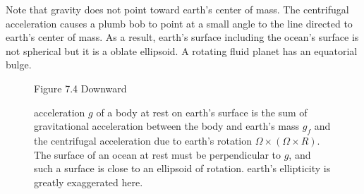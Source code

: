 Note that gravity does not point toward earth's center of mass. The centrifugal
acceleration causes a plumb bob to point at a small angle to the line directed
to earth's center of mass. As a result, earth's surface including the ocean's
surface is not spherical but it is a oblate ellipsoid. A rotating fluid planet
has an equatorial bulge.
\begin{figure}[h!]
\footnotesize
Figure 7.4 Downward \rule{0mm}{4ex}acceleration $g$ of a body at
rest on earth's surface is the sum of gravitational acceleration between the body
and earth's mass $g_f$ and the centrifugal acceleration due to earth's
rotation $\Omega\times(\Omega\times{R})$. The surface of an ocean at
rest must be perpendicular to $g$, and such a surface is close to an
ellipsoid of rotation. earth's ellipticity is greatly exaggerated here.
\label{fig:gravitysketch}
\vspace{-2ex}
\end{figure}

